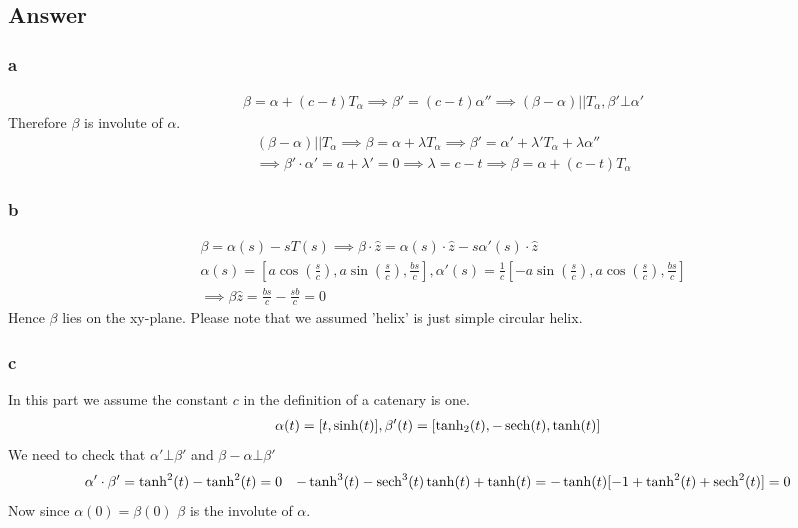 \documentclass[
	12pt, %
]{fphw}
\theoremstyle{plain}
\begin{document}
\subsection*{Answer}

\subsubsection*{a}
\begin{align*}
&\beta = \alpha + (c-t)T_\alpha \implies \beta'=(c-t)\alpha''\implies (\beta-\alpha)||T_\alpha ,   \beta'\bot \alpha'
\end{align*}
Therefore $\beta$ is involute of $\alpha$.
\begin{align*}
&(\beta-\alpha)||T_\alpha \implies \beta=\alpha+\lambda T_\alpha \implies \beta'=\alpha'+\lambda'T_\alpha+\lambda \alpha''\\
&\implies \beta'\cdot \alpha'=a+\lambda'=0 \implies \lambda=c-t \implies \beta=\alpha+(c-t)T_\alpha
\end{align*}
\subsubsection*{b}
\begin{align*}
&\beta=\alpha(s)-sT(s) \implies \beta\cdot \hat{z} = \alpha(s)\cdot\hat{z} - s\alpha'(s)\cdot\hat{z}\\
&\alpha(s)=[a\cos(\frac{s}{c}), a\sin(\frac{s}{c}), \frac{bs}{c}], \alpha'(s)=\frac{1}{c}[-a\sin(\frac{s}{c}), a\cos(\frac{s}{c}), \frac{bs}{c}]\\
&\implies \beta\hat{z} = \frac{bs}{c} - \frac{sb}{c}=0
\end{align*}
Hence $\beta$ lies on the xy-plane.
Please note that we assumed 'helix' is just simple circular helix.

\subsubsection*{c}
In this part we assume the constant $c$ in the definition of a catenary is one.
\begin{align*}
    \alpha(t)=[t, \sinh(t)], \beta'(t)=[\tanh_2(t), -\sech(t), \tanh(t)]
\end{align*}
We need to check that $\alpha'\bot \beta'$ and $\beta - \alpha\bot \beta'$
\begin{align*}
&\alpha'\cdot\beta'=\tanh^2(t) - \tanh^2(t) =0
&-\tanh^3(t)-\sech^3(t)\tanh(t)+\tanh(t)=-\tanh(t)[-1 + \tanh^2(t)+\sech^2(t)]=0
\end{align*}
Now since $\alpha(0)=\beta(0)$ $\beta$ is the involute of $\alpha$.
\end{document}
